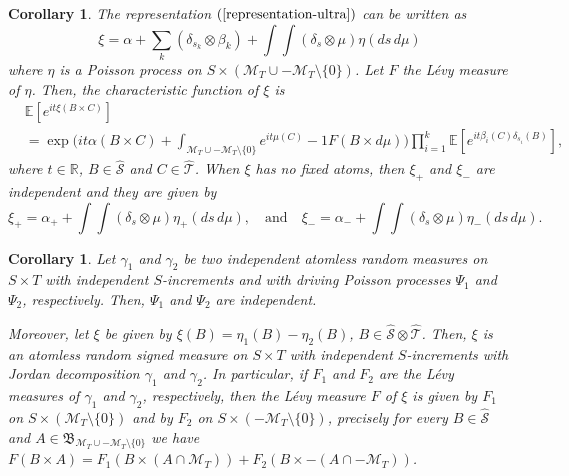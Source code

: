 \documentclass{article}
\theoremstyle{plain}
\newtheorem{corollary}[theorem]{Corollary}
\theoremstyle{remark}
\begin{document}
\begin{corollary}\label{co-incited-5}
	The representation $(\ref{representation-ultra})$ can be written as
	\begin{equation*}
		\xi=\alpha+\sum_{k}(\delta_{s_k}\otimes\beta_k)+\int\int (\delta_s\otimes\mu)\eta(ds\,d\mu)
	\end{equation*}
	where $\eta$ is a Poisson process on $S\times(\mathcal{M}_T\cup-\mathcal{M}_T\setminus\{0\})$. Let $F$ the L\'{e}vy measure of $\eta$. Then, the characteristic function of $\xi$ is
	\begin{align*}
		&\mathbb{E}\left[e^{it\xi(B\times C)}\right]\\&=\exp\bigg(it\alpha(B\times C) +\int_{\mathcal{M}_T\cup-\mathcal{M}_T\setminus\{0\}}e^{it\mu(C)} -1F(B\times d\mu)\bigg)\prod_{i=1}^{k}\mathbb{E}\left[e^{it \beta_i(C)\delta_{s_i}(B)}\right],
	\end{align*}
	where $t\in\mathbb{R}$, $B\in\hat{\mathcal{S}}$ and $C\in\hat{\mathcal{T}}$. When $\xi$ has no fixed atoms, then $\xi_+$ and $\xi_-$ are independent and they are given by
	\begin{equation*}
		\xi_+=\alpha_++\int\int (\delta_s\otimes\mu)\eta_+(ds\,d\mu),\quad\text{and}\quad 	
		\xi_-=\alpha_-+\int\int (\delta_s\otimes\mu)\eta_-(ds\,d\mu).
	\end{equation*}
\end{corollary}

\begin{corollary}\label{co-ultra-two-CRSM-2}
	Let $\gamma_1$ and $\gamma_2$ be two independent atomless random measures on $S\times T$ with independent $S$-increments and with driving Poisson processes $\Psi_1$ and $\Psi_2$, respectively. Then, $\Psi_1$ and $\Psi_2$ are independent. 
	
	Moreover, let $\xi$ be given by $\xi(B)=\eta_1(B)-\eta_2(B)$, $B\in\hat{\mathcal{S}}\otimes\hat{\mathcal{T}}$. Then, $\xi$ is an atomless random signed measure on $S\times T$ with independent $S$-increments with Jordan decomposition $\gamma_1$ and $\gamma_2$. In particular, if $F_1$ and $F_2$ are the L\'{e}vy measures of $\gamma_1$ and $\gamma_2$, respectively, then the L\'{e}vy measure $F$ of $\xi$ is given by $F_1$ on $S\times(\mathcal{M}_T\setminus\{0\})$ and by $F_2$ on $S\times(-\mathcal{M}_T\setminus\{0\})$, precisely for every $B\in\hat{\mathcal{S}}$ and $A\in\mathfrak{B}_{\mathcal{M}_T\cup-\mathcal{M}_T\setminus\{0\}}$ we have $F(B\times A)=F_1(B\times (A\cap\mathcal{M}_T))+F_2(B\times -(A\cap-\mathcal{M}_T))$.
\end{corollary}
\end{document}
